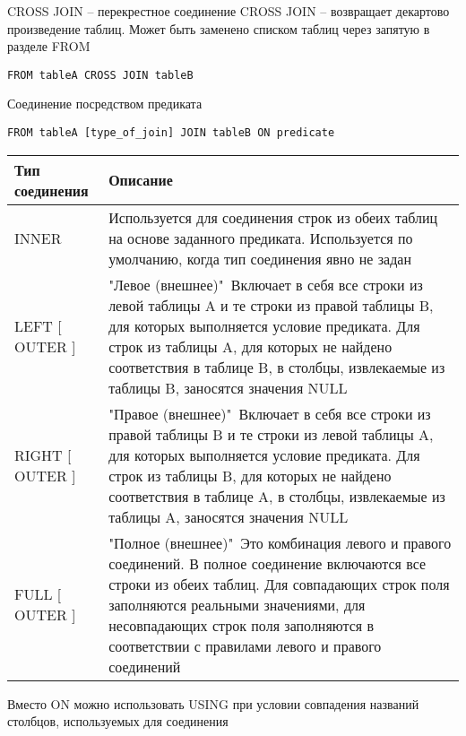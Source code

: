 \documentclass[12pt]{article}
\begin{document}
\begin{defin}{CROSS JOIN -- перекрестное соединение}
    CROSS JOIN -- возвращает декартово произведение таблиц. Может быть заменено списком таблиц через запятую в разделе FROM

\begin{lstlisting}
FROM tableA CROSS JOIN tableB
\end{lstlisting}
\end{defin}

\begin{nota}{Соединение посредством предиката}
\begin{lstlisting}
FROM tableA [type_of_join] JOIN tableB ON predicate
\end{lstlisting}

    \begin{center}
        \begin{tabular}{|m{9em}|m{29em}|}
            \hline 
            Тип соединения & Описание \\ 
            \hline
            INNER & Используется для соединения строк из обеих таблиц на основе заданного предиката. Используется по умолчанию, когда тип соединения явно не задан \\
            \hline 
            LEFT [ OUTER ] & "Левое (внешнее)"\ Включает в себя все строки из левой таблицы A и те строки из правой таблицы B, для которых выполняется условие предиката. Для строк из таблицы A, для которых не найдено соответствия в таблице B, в столбцы, извлекаемые из таблицы B, заносятся значения NULL \\
            \hline 
            RIGHT [ OUTER ] & "Правое (внешнее)"\ Включает в себя все строки из правой таблицы B и те строки из левой таблицы A, для которых выполняется условие предиката. Для строк из таблицы B, для которых не найдено соответствия в таблице A, в столбцы, извлекаемые из таблицы A, заносятся значения NULL \\
            \hline
            FULL [ OUTER ] & "Полное (внешнее)"\ Это комбинация левого и правого соединений. В полное соединение включаются все строки из обеих таблиц. Для совпадающих строк поля заполняются реальными значениями, для несовпадающих строк поля заполняются в соответствии с правилами левого и правого соединений \\
            \hline
        \end{tabular}
    \end{center}
\end{nota}

\begin{Remark}{}
    Вместо ON можно использовать USING при условии совпадения названий столбцов, используемых для соединения
\end{Remark}
\end{document}
